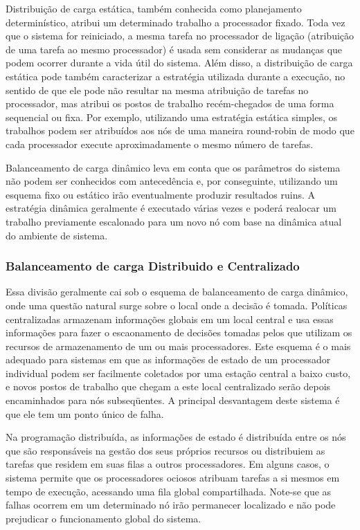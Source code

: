 Distribuição de carga estática, também conhecida como planejamento determinístico, atribui um determinado trabalho a processador fixado. Toda vez que o sistema for reiniciado, a mesma tarefa no processador de ligação (atribuição de uma tarefa ao mesmo processador) é usada sem considerar as mudanças que podem ocorrer durante a vida útil do sistema. Além disso, a distribuição de carga estática pode também caracterizar a estratégia utilizada durante a execução, no sentido de que ele pode não resultar na mesma atribuição de tarefas no processador, mas atribui os postos de trabalho recém-chegados de uma forma sequencial ou fixa. Por exemplo, utilizando uma estratégia estática simples, os trabalhos podem ser atribuídos aos nós de uma maneira round-robin de modo que cada processador execute aproximadamente o mesmo número de tarefas. 

Balanceamento de carga dinâmico leva em conta que os parâmetros do sistema não podem ser conhecidos com antecedência e, por conseguinte, utilizando um esquema fixo ou estático irão eventualmente produzir resultados ruins. A estratégia dinâmica geralmente é executado várias vezes e poderá realocar um trabalho previamente escalonado para um novo nó com base na dinâmica atual do ambiente de sistema.

\subsubsection{Balanceamento de carga Distribuido e Centralizado}

Essa divisão geralmente cai sob o esquema de balanceamento de carga dinâmico, onde uma questão natural surge sobre o local onde a decisão é tomada. Políticas centralizadas armazenam informações globais em um local central e usa essas informações para fazer o escaonamento de decisões tomadas pelos que utilizam os recursos de armazenamento de um ou mais processadores. Este esquema é o mais adequado para sistemas em que as informações de estado de um processador individual podem ser facilmente coletados por uma estação central a baixo custo, e novos postos de trabalho que chegam a este local centralizado serão depois encaminhados para nós subseqüentes. A principal desvantagem deste sistema é que ele tem um ponto único de falha. 

Na programação distribuída, as informações de estado é distribuída entre os nós que são responsáveis na gestão dos seus próprios recursos ou distribuiem as tarefas que residem em suas filas a outros processadores. Em alguns casos, o sistema permite que os processadores ociosos atribuam tarefas a si mesmos em tempo de execução, acessando uma fila global compartilhada. Note-se que as falhas ocorrem em um determinado nó irão permanecer localizado e não pode prejudicar o funcionamento global do sistema. 

